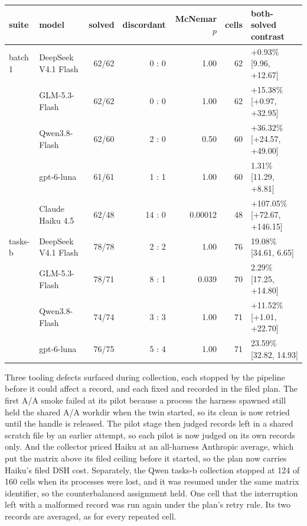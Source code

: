 \documentclass[10pt]{article}
\newcommand*{\mi}{\textminus}   %
\newenvironment{inlinetable}{\par\medskip\noindent\begin{minipage}{\linewidth}\centering\small}{\end{minipage}\par\bigskip}
\begin{document}
\begin{appendices}
\begin{inlinetable}
\label{tab:rerunquality}
\setlength{\tabcolsep}{4pt}
\begin{tabular}{@{}llrrrrl@{}}
\toprule
suite & model & solved & discordant & McNemar $p$ & cells & both-solved contrast \\
\midrule
batch 1 & DeepSeek V4.1 Flash & 62/62 & 0 : 0 & 1.00 & 62 & +0.93\% [\mi{}9.96, +12.67] \\
 & GLM-5.3-Flash & 62/62 & 0 : 0 & 1.00 & 62 & +15.38\% [+0.97, +32.95] \\
 & Qwen3.8-Flash & 62/60 & 2 : 0 & 0.50 & 60 & +36.32\% [+24.57, +49.00] \\
 & gpt-6-luna & 61/61 & 1 : 1 & 1.00 & 60 & \mi{}1.31\% [\mi{}11.29, +8.81] \\
 & Claude Haiku 4.5 & 62/48 & 14 : 0 & 0.00012 & 48 & +107.05\% [+72.67, +146.15] \\
\midrule
tasks-b & DeepSeek V4.1 Flash & 78/78 & 2 : 2 & 1.00 & 76 & \mi{}19.08\% [\mi{}34.61, \mi{}6.65] \\
 & GLM-5.3-Flash & 78/71 & 8 : 1 & 0.039 & 70 & \mi{}2.29\% [\mi{}17.25, +14.80] \\
 & Qwen3.8-Flash & 74/74 & 3 : 3 & 1.00 & 71 & +11.52\% [+1.01, +22.70] \\
 & gpt-6-luna & 76/75 & 5 : 4 & 1.00 & 71 & \mi{}23.59\% [\mi{}32.82, \mi{}14.93] \\
\bottomrule
\end{tabular}
\end{inlinetable}

Three tooling defects surfaced during collection, each stopped by the pipeline before it could
affect a record, and each fixed and recorded in the filed plan. The first A/A smoke failed at its pilot
because a process the harness spawned still held the shared A/A workdir when the twin started, so
its clean is now retried until the handle is released. The pilot stage then judged records left in a
shared scratch file by an earlier attempt, so each pilot is now judged on its own records only. And
the collector priced Haiku at an all-harness Anthropic average, which put the matrix above its filed
ceiling before it started, so the plan now carries Haiku's filed DSH cost. Separately, the Qwen
tasks-b collection stopped at 124 of 160 cells when its processes were lost, and it was resumed
under the same matrix identifier, so the counterbalanced assignment held. One cell that the
interruption left with a malformed record was run again under the plan's retry rule. Its two records
are averaged, as for every repeated cell.


\end{appendices}
\end{document}
